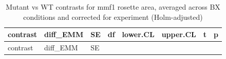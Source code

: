 \documentclass[
  10pt,
]{article}
\begin{document}
\begin{longtable}[]{@{}
  >{\raggedright\arraybackslash}p{}
  >{\raggedleft\arraybackslash}p{}
  >{\raggedleft\arraybackslash}p{}
  >{\raggedleft\arraybackslash}p{}
  >{\raggedleft\arraybackslash}p{}
  >{\raggedleft\arraybackslash}p{}
  >{\raggedleft\arraybackslash}p{}
  >{\raggedleft\arraybackslash}p{}@{}}
\caption{Mutant vs WT contrasts for mmf1 rosette area, averaged across
BX conditions and corrected for experiment
(Holm-adjusted)}\tabularnewline
\toprule\noalign{}
\begin{minipage}[b]{\linewidth}\raggedright
contrast
\end{minipage} & \begin{minipage}[b]{\linewidth}\raggedleft
diff\_EMM
\end{minipage} & \begin{minipage}[b]{\linewidth}\raggedleft
SE
\end{minipage} & \begin{minipage}[b]{\linewidth}\raggedleft
df
\end{minipage} & \begin{minipage}[b]{\linewidth}\raggedleft
lower.CL
\end{minipage} & \begin{minipage}[b]{\linewidth}\raggedleft
upper.CL
\end{minipage} & \begin{minipage}[b]{\linewidth}\raggedleft
t
\end{minipage} & \begin{minipage}[b]{\linewidth}\raggedleft
p
\end{minipage} \\
\midrule\noalign{}
\endfirsthead
\toprule\noalign{}
\begin{minipage}[b]{\linewidth}\raggedright
contrast
\end{minipage} & \begin{minipage}[b]{\linewidth}\raggedleft
diff\_EMM
\end{minipage} & \begin{minipage}[b]{\linewidth}\raggedleft
SE
\end{minipage} & \begin{minipage}[b]{\linewidth}\raggedleft

\end{minipage}
\end{longtable}
\end{document}
